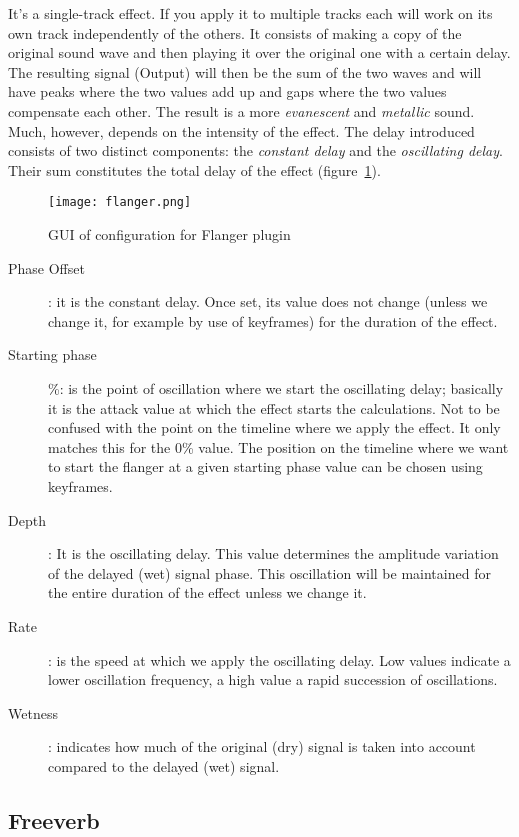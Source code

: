It's a single-track effect. If you apply it to multiple tracks each will work on its own track independently of the others.
It consists of making a copy of the original sound wave and then playing it over the original one with a certain delay. The resulting signal (Output) will then be the sum of the two waves and will have peaks where the two values add up and gaps where the two values compensate each other. The result is a more \textit{evanescent} and \textit{metallic} sound. Much, however, depends on the intensity of the effect.
The delay introduced consists of two distinct components: the \textit{constant delay} and the \textit{oscillating delay}. Their sum constitutes the total delay of the effect (figure~\ref{fig:flanger}).

\begin{figure}[htpb]
	\centering
	\texttt{[image: flanger.png]}
	\caption{GUI of configuration for Flanger plugin}
	\label{fig:flanger}
\end{figure}

\begin{description}
	\item[Phase Offset]: it is the constant delay. Once set, its value does not change (unless we change it, for example by use of keyframes) for the duration of the effect.
	\item[Starting phase] \%: is the point of oscillation where we start the oscillating delay; basically it is the attack value at which the effect starts the calculations. Not to be confused with the point on the timeline where we apply the effect. It only matches this for the 0\% value. The position on the timeline where we want to start the flanger at a given starting phase value can be chosen using keyframes.
	\item[Depth]: It is the oscillating delay. This value determines the amplitude variation of the delayed (wet) signal phase. This oscillation will be maintained for the entire duration of the effect unless we change it.
	\item[Rate]: is the speed at which we apply the oscillating delay. Low values indicate a lower oscillation frequency, a high value a rapid succession of oscillations.
	\item[Wetness]: indicates how much of the original (dry) signal is taken into account compared to the delayed (wet) signal.
\end{description}

\subsection{Freeverb}%
\label{sub:freeverb}

